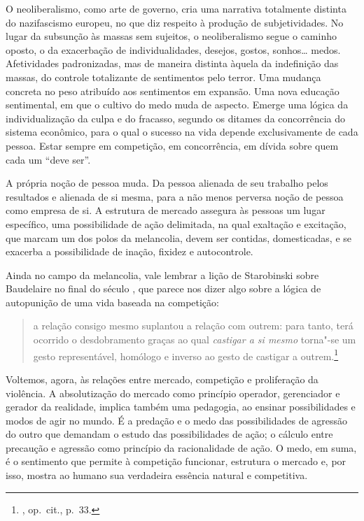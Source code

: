 \asterisc

O neoliberalismo, como arte de governo, cria uma narrativa totalmente
distinta do nazifascismo europeu, no que diz respeito à produção de
subjetividades. No lugar da subsunção às massas sem sujeitos, o neoliberalismo
segue o caminho oposto, o da exacerbação de individualidades, desejos,
gostos, sonhos\ldots{} medos. Afetividades padronizadas, mas de maneira
distinta àquela da indefinição das massas, do controle totalizante de
sentimentos pelo terror. Uma mudança concreta no peso atribuído aos
sentimentos em expansão. Uma nova educação sentimental, em que o cultivo
do medo muda de aspecto. Emerge uma lógica da individualização da culpa
e do fracasso, segundo os ditames da concorrência do sistema econômico,
para o qual o sucesso na vida depende exclusivamente de cada pessoa.
Estar sempre em competição, em concorrência, em dívida sobre quem cada
um ``deve ser''.

A própria noção de pessoa muda. Da pessoa alienada de seu trabalho pelos
resultados e alienada de si mesma, para a não menos perversa noção de
pessoa como empresa de si. A estrutura de mercado assegura às pessoas
um lugar específico, uma possibilidade de ação delimitada, na qual
exaltação e excitação, que marcam um dos polos da melancolia, devem ser
contidas, domesticadas, e se exacerba a possibilidade de inação, fixidez
e autocontrole.

Ainda no campo da melancolia, vale lembrar a lição de Starobinski sobre
Baudelaire no final do século , que parece nos dizer algo sobre a
lógica de autopunição de uma vida baseada na competição:

\begin{quote}
a relação
consigo mesmo suplantou a relação com outrem: para tanto, terá ocorrido
o desdobramento graças ao qual \emph{castigar a si mesmo} torna"-se um
gesto representável, homólogo e inverso ao gesto de castigar a
outrem.\footnote{, op.~cit., p.~33.}
\end{quote}

\asterisc

Voltemos, agora, às relações entre mercado, competição e proliferação da violência.
A absolutização do mercado como princípio operador, gerenciador e
gerador da realidade, implica também uma pedagogia, ao ensinar
possibilidades e modos de agir no mundo. É a predação e o medo das
possibilidades de agressão do outro que demandam o estudo das
possibilidades de ação; o cálculo entre precaução e agressão como
princípio da racionalidade de ação. O medo, em suma, é o sentimento que
permite à competição funcionar, estrutura o mercado e, por isso, mostra ao humano
sua verdadeira essência natural e competitiva.

